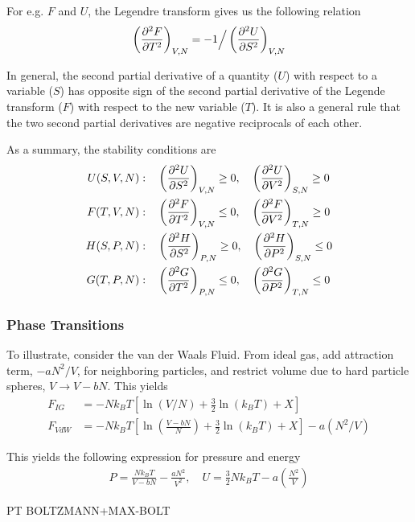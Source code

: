 \documentclass[a4paper, english, 12pt]{article}
\newcommand{\closed}[1]{\left( #1 \right)}
\newcommand{\bracket}[1]{\left[ #1 \right]}
\begin{document}
\begin{multicols*}{2}
For e.g. $F$ and $U$, the Legendre transform gives us the following relation 
\begin{align*}
    \closed{\pdv[2]{F}{T}}_{V,N} = - 1 \Big/ \closed{\pdv[2]{U}{S}}_{V,N} 
\end{align*}

In general, the second partial derivative of a quantity ($U$) with respect to a variable ($S$) has opposite sign of the second partial derivative of the Legende transform ($F$) with respect to the new variable ($T$). It is also a general rule that the two second partial derivatives are negative reciprocals of each other.     

As a summary, the stability conditions are 
\begin{align*}
    U(S,V,N):&\quad \closed{\pdv[2]{U}{S}}_{V,N} \geq0,\quad \closed{\pdv[2]{U}{V}}_{S,N} \geq 0 \\ 
    F(T,V,N):&\quad \closed{\pdv[2]{F}{T}}_{V,N} \leq0,\quad \closed{\pdv[2]{F}{V}}_{T,N} \geq 0 \\
    H(S,P,N):&\quad \closed{\pdv[2]{H}{S}}_{P,N} \geq0,\quad \closed{\pdv[2]{H}{P}}_{S,N} \leq 0 \\ 
    G(T,P,N):&\quad \closed{\pdv[2]{G}{T}}_{P,N} \leq0,\quad \closed{\pdv[2]{G}{P}}_{T,N} \leq 0 
\end{align*}



\subsubsection*{\scriptsize Phase Transitions}
To illustrate, consider the van der Waals Fluid. From ideal gas, add attraction term, $-a N^2/V$, for neighboring particles, and restrict volume due to hard particle spheres, $V\to V-bN$. This yields 
\begin{align*}
    F_{IG} &= -N k_B T \bracket{\ln(V/N) + \frac{3}{2}\ln(k_B T)+X} \\ 
    F_{VdW} &= - N k_B T \bracket{\ln\closed{\frac{V-bN}{N}} + \frac{3}{2}\ln(k_B T)+X} - a(N^2/V)
\end{align*}

This yields the following expression for pressure and energy 
\begin{align*}
    P = \frac{Nk_B T}{V - bN} - \frac{a N^2}{V^2},\quad U = \frac{3}{2}N k_B T - a \closed{\frac{N^2}{V}}
\end{align*}


PT 
BOLTZMANN+MAX-BOLT 

\subsection*{}


\end{multicols*}
\end{document}
